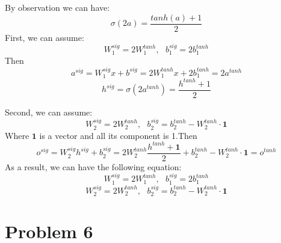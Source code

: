 \documentclass[twoside]{article}
\begin{document}
By observation we can have:
$$\sigma(2a) = \frac{tanh(a)+1}{2}$$
First, we can assume:
$$W_1^{sig} = 2W_1^{tanh},\ \ \ b_1^{sig}=2b_1^{tanh}$$
Then $$a^{sig} = W^{sig}_{1}x + b^{sig} = 2W_1^{tanh}x+2b_1^{tanh} = 2 a^{tanh}$$
$$h^{sig}=\sigma(2 a^{tanh}) = \frac{h^{tanh}+1}{2}$$

Second, we can assume:
$$W_2^{sig} = 2W_2^{tanh},\ \ \ b_2^{sig}=b_2^{tanh}-W_2^{tanh} \cdot \mathbf{1}$$
Where $\mathbf{1}$ is a vector and all its component is 1.Then $$o^{sig} =  W^{sig}_2 h^{sig} + b^{sig}_2=2W_2^{tanh}\frac{h^{tanh}+\mathbf{1}}{2} +b_2^{tanh}-W_2^{tanh} \cdot \mathbf{1}=o^{tanh} $$
As a result, we can have the following equation:
$$W_1^{sig} = 2W_1^{tanh},\ \ \ b_1^{sig}=2b_1^{tanh}$$
$$W_2^{sig} = 2W_2^{tanh},\ \ \ b_2^{sig}=b_2^{tanh}-W_2^{tanh} \cdot \mathbf{1}$$

\section{Problem 6}
\end{document}

